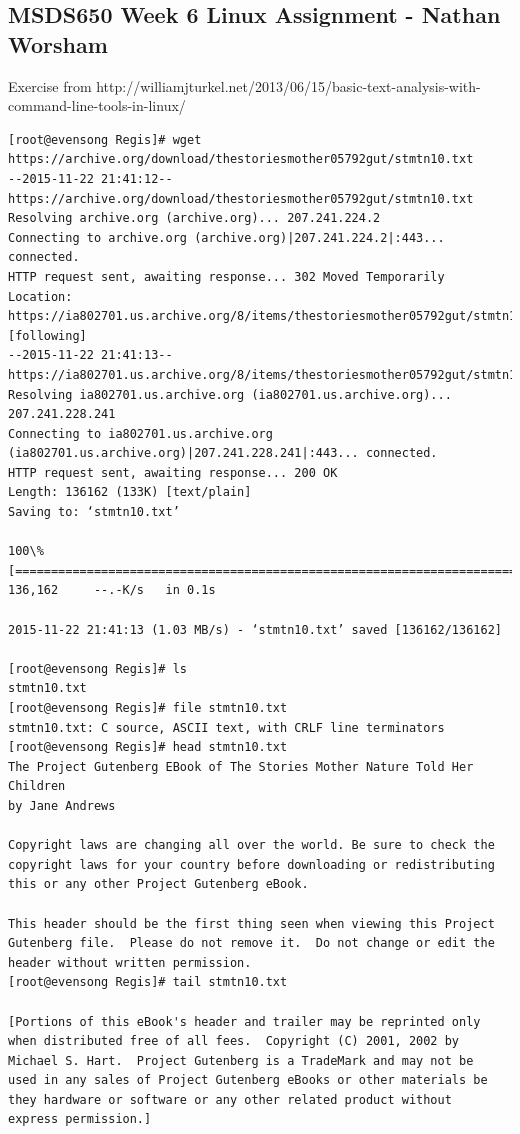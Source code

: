 \documentclass[10pt]{article}
\begin{document}
\subsection*{MSDS650 Week 6 Linux Assignment - Nathan Worsham}
Exercise from http://williamjturkel.net/2013/06/15/basic-text-analysis-with-command-line-tools-in-linux/
\begin{Verbatim}[fontsize=\scriptsize]
[root@evensong Regis]# wget https://archive.org/download/thestoriesmother05792gut/stmtn10.txt
--2015-11-22 21:41:12--  https://archive.org/download/thestoriesmother05792gut/stmtn10.txt
Resolving archive.org (archive.org)... 207.241.224.2
Connecting to archive.org (archive.org)|207.241.224.2|:443... connected.
HTTP request sent, awaiting response... 302 Moved Temporarily
Location: https://ia802701.us.archive.org/8/items/thestoriesmother05792gut/stmtn10.txt [following]
--2015-11-22 21:41:13--  https://ia802701.us.archive.org/8/items/thestoriesmother05792gut/stmtn10.txt
Resolving ia802701.us.archive.org (ia802701.us.archive.org)... 207.241.228.241
Connecting to ia802701.us.archive.org (ia802701.us.archive.org)|207.241.228.241|:443... connected.
HTTP request sent, awaiting response... 200 OK
Length: 136162 (133K) [text/plain]
Saving to: ‘stmtn10.txt’

100\%[==================================================================================================================================================================>] 136,162     --.-K/s   in 0.1s    

2015-11-22 21:41:13 (1.03 MB/s) - ‘stmtn10.txt’ saved [136162/136162]

[root@evensong Regis]# ls
stmtn10.txt
[root@evensong Regis]# file stmtn10.txt
stmtn10.txt: C source, ASCII text, with CRLF line terminators
[root@evensong Regis]# head stmtn10.txt
The Project Gutenberg EBook of The Stories Mother Nature Told Her Children
by Jane Andrews

Copyright laws are changing all over the world. Be sure to check the
copyright laws for your country before downloading or redistributing
this or any other Project Gutenberg eBook.

This header should be the first thing seen when viewing this Project
Gutenberg file.  Please do not remove it.  Do not change or edit the
header without written permission.
[root@evensong Regis]# tail stmtn10.txt

[Portions of this eBook's header and trailer may be reprinted only
when distributed free of all fees.  Copyright (C) 2001, 2002 by
Michael S. Hart.  Project Gutenberg is a TradeMark and may not be
used in any sales of Project Gutenberg eBooks or other materials be
they hardware or software or any other related product without
express permission.]


\end{Verbatim}
\end{document}
